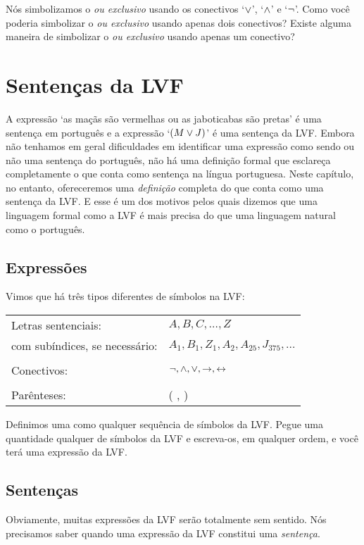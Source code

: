 \problempart
Nós simbolizamos o \emph{ou exclusivo} usando os conectivos `$\vee$', `$\wedge$' e `$\neg$'.
Como você poderia simbolizar o \emph{ou exclusivo} usando apenas dois conectivos?
Existe alguma maneira de simbolizar o \emph{ou exclusivo} usando apenas um conectivo?


\chapter{Sentenças da LVF}\label{s:TFLSentences}
A expressão `as maçãs são vermelhas ou as jaboticabas são pretas' é uma sentença em português e a expressão `$(M \vee J)$' é uma sentença da LVF.
Embora não tenhamos em geral dificuldades em identificar uma expressão como sendo ou não uma sentença do português, não há uma definição formal que esclareça completamente o que conta como sentença na língua portuguesa.
Neste capítulo, no entanto, ofereceremos uma \emph{definição} completa do que conta como uma sentença da LVF.
E esse é um dos motivos pelos quais dizemos que uma linguagem formal como a LVF é mais precisa do que uma linguagem natural como o português.


\section{Expressões}

Vimos que há três tipos diferentes de símbolos na LVF:
\begin{center}
\begin{tabular}{l l}
Letras sentenciais: & $A,B,C,\ldots,Z$\\
com subíndices, se necessário: & $A_1, B_1,Z_1,A_2,A_{25},J_{375},\ldots$\\
\\
Conectivos: & $\neg,\wedge,\vee,\rightarrow,\leftrightarrow$\\
\\
Parênteses: &( , )\\
\end{tabular}
\end{center}
Definimos uma  como qualquer sequência de símbolos da LVF.
Pegue uma quantidade qualquer de símbolos da LVF e escreva-os, em qualquer ordem, e você terá uma expressão da LVF.


\section{Sentenças}\label{s:Sentences}
Obviamente, muitas expressões da LVF serão totalmente sem sentido.
Nós precisamos saber quando uma expressão da LVF constitui uma \emph{sentença}.


